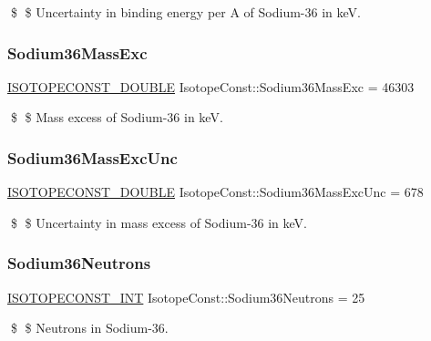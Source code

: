 \$ \$ Uncertainty in binding energy per A of Sodium-\/36 in keV. \mbox{\label{group___isotope_const-_sodium-_na36_gaa5bf643224bc3c65db6feb69151f82b5}} 
\subsubsection{\texorpdfstring{Sodium36\+Mass\+Exc}{Sodium36MassExc}}
{\footnotesize\ttfamily \mbox{\hyperlink{group___isotope_const-_macros_ga8f45a7272ce02c0b4c65c44636ed719a}{I\+S\+O\+T\+O\+P\+E\+C\+O\+N\+S\+T\+\_\+\+D\+O\+U\+B\+LE}} Isotope\+Const\+::\+Sodium36\+Mass\+Exc = 46303}

\$ \$ Mass excess of Sodium-\/36 in keV. \mbox{\label{group___isotope_const-_sodium-_na36_ga06056ec49fe5232edb9800ada30ae668}} 
\subsubsection{\texorpdfstring{Sodium36\+Mass\+Exc\+Unc}{Sodium36MassExcUnc}}
{\footnotesize\ttfamily \mbox{\hyperlink{group___isotope_const-_macros_ga8f45a7272ce02c0b4c65c44636ed719a}{I\+S\+O\+T\+O\+P\+E\+C\+O\+N\+S\+T\+\_\+\+D\+O\+U\+B\+LE}} Isotope\+Const\+::\+Sodium36\+Mass\+Exc\+Unc = 678}

\$ \$ Uncertainty in mass excess of Sodium-\/36 in keV. \mbox{\label{group___isotope_const-_sodium-_na36_ga817b17cbcc217a783f749abd6e5a3dfa}} 
\subsubsection{\texorpdfstring{Sodium36\+Neutrons}{Sodium36Neutrons}}
{\footnotesize\ttfamily \mbox{\hyperlink{group___isotope_const-_macros_ga5f18360b3e99483a35c32d789e62621c}{I\+S\+O\+T\+O\+P\+E\+C\+O\+N\+S\+T\+\_\+\+I\+NT}} Isotope\+Const\+::\+Sodium36\+Neutrons = 25}

\$ \$ Neutrons in Sodium-\/36. \mbox{\label{group___isotope_const-_sodium-_na36_gae71afde0676acc9a42eda42b7ae4343d}} 
